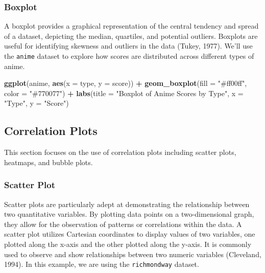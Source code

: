 \documentclass[
]{book}
\newenvironment{Shaded}{\begin{snugshade}}{\end{snugshade}}
\newcommand{\AttributeTok}[1]{\textcolor[rgb]{0.13,0.29,0.53}{#1}}
\newcommand{\FunctionTok}[1]{\textcolor[rgb]{0.13,0.29,0.53}{\textbf{#1}}}
\newcommand{\NormalTok}[1]{#1}
\newcommand{\SpecialCharTok}[1]{\textcolor[rgb]{0.81,0.36,0.00}{\textbf{#1}}}
\newcommand{\StringTok}[1]{\textcolor[rgb]{0.31,0.60,0.02}{#1}}
\begin{document}
\hypertarget{boxplot}{%
\subsubsection*{Boxplot}\label{boxplot}}

A boxplot provides a graphical representation of the central tendency and spread of a dataset, depicting the median, quartiles, and potential outliers. Boxplots are useful for identifying skewness and outliers in the data (Tukey, 1977). We'll use the \texttt{anime} dataset to explore how scores are distributed across different types of anime.

\begin{Shaded}
\begin{Highlighting}[]
\FunctionTok{ggplot}\NormalTok{(anime, }\FunctionTok{aes}\NormalTok{(}\AttributeTok{x =}\NormalTok{ type, }\AttributeTok{y =}\NormalTok{ score)) }\SpecialCharTok{+}
  \FunctionTok{geom\_boxplot}\NormalTok{(}\AttributeTok{fill =} \StringTok{"\#ff00ff"}\NormalTok{, }\AttributeTok{color =} \StringTok{"\#770077"}\NormalTok{) }\SpecialCharTok{+}
  \FunctionTok{labs}\NormalTok{(}\AttributeTok{title =} \StringTok{"Boxplot of Anime Scores by Type"}\NormalTok{,}
       \AttributeTok{x =} \StringTok{"Type"}\NormalTok{,}
       \AttributeTok{y =} \StringTok{"Score"}\NormalTok{)}
\end{Highlighting}
\end{Shaded}

\hypertarget{correlation-plots}{%
\subsection*{Correlation Plots}\label{correlation-plots}}

This section focuses on the use of correlation plots including scatter plots, heatmaps, and bubble plots.

\hypertarget{scatter-plot}{%
\subsubsection*{Scatter Plot}\label{scatter-plot}}

Scatter plots are particularly adept at demonstrating the relationship between two quantitative variables. By plotting data points on a two-dimensional graph, they allow for the observation of patterns or correlations within the data. A scatter plot utilizes Cartesian coordinates to display values of two variables, one plotted along the x-axis and the other plotted along the y-axis. It is commonly used to observe and show relationships between two numeric variables (Cleveland, 1994). In this example, we are using the \texttt{richmondway} dataset.
\end{document}
